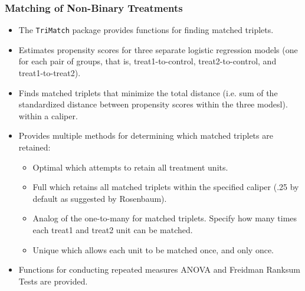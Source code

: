 \documentclass[10pt,slidestop,mathserif,c]{beamer}
\begin{document}
\begin{frame}
    \frametitle{Matching of Non-Binary Treatments}
    
    \begin{itemize}
        \item The \texttt{TriMatch} package provides functions for finding matched triplets.
        \item Estimates propensity scores for three separate logistic regression models (one for each pair of groups, that is, treat1-to-control, treat2-to-control, and treat1-to-treat2).
        \item Finds matched triplets that minimize the total distance (i.e. sum of the standardized distance between propensity scores within the three modesl). within a caliper.
        \item Provides multiple methods for determining which matched triplets are retained:
            \begin{itemize}
                \item Optimal which attempts to retain all treatment units.
                \item Full which retains all matched triplets within the specified caliper (.25 by default as suggested by Rosenbaum).
                \item Analog of the one-to-many for matched triplets. Specify how many times each treat1 and treat2 unit can be matched.
                \item Unique which allows each unit to be matched once, and only once.
            \end{itemize}
        \item Functions for conducting repeated measures ANOVA and Freidman Ranksum Tests are provided.
    \end{itemize}
\end{frame}
\end{document}
